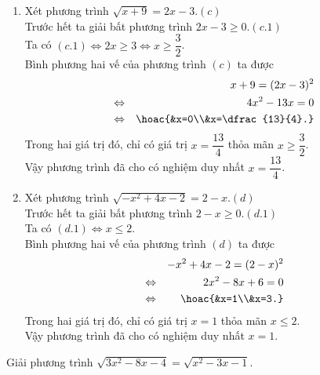 \begin{bt}
{\begin{enumerate}
			\item Xét phương trình $\sqrt{x+9}=2x-3$.\qquad $(c)$\\
			Trước hết ta giải bất phương trình $2x-3\ge 0$.\qquad $(c.1)$\\
			Ta có $(c.1)\Leftrightarrow 2x\ge 3\Leftrightarrow x\ge \dfrac{3}{2}$.\\
			Bình phương hai vế của phương trình $(c)$ ta được 
			\allowdisplaybreaks 
			\begin{eqnarray*}
				&&x+9=(2x-3)^2\\
				&\Leftrightarrow& 4x^2-13x=0\\
				&\Leftrightarrow& \hoac{&x=0\\&x=\dfrac{13}{4}.}
			\end{eqnarray*}
			Trong hai giá trị đó, chỉ có giá trị $x=\dfrac{13}{4}$ thỏa mãn $x\ge \dfrac{3}{2}$.\\
			Vậy phương trình đã cho có nghiệm duy nhất $x=\dfrac{13}{4}$.
			\item Xét phương trình $\sqrt{-x^2+4x-2}=2-x$.\qquad $(d)$\\
			Trước hết ta giải bất phương trình $2-x\ge 0$.\qquad $(d.1)$\\
			Ta có $(d.1)\Leftrightarrow x\le 2$.\\
			Bình phương hai vế của phương trình $(d)$ ta được 
			\allowdisplaybreaks 
			\begin{eqnarray*}
				&&-x^2+4x-2=(2-x)^2\\
				&\Leftrightarrow& 2x^2-8x+6=0\\
				&\Leftrightarrow& \hoac{&x=1\\&x=3.}
			\end{eqnarray*}
			Trong hai giá trị đó, chỉ có giá trị $x=1$ thỏa mãn $x\le 2$.\\
			Vậy phương trình đã cho có nghiệm duy nhất $x=1$.
		\end{enumerate}
	}
\end{bt}

\begin{bt}%
	Giải phương trình $\sqrt{3x^2-8x-4}=\sqrt{x^2-3x-1}$.
\end{bt}

